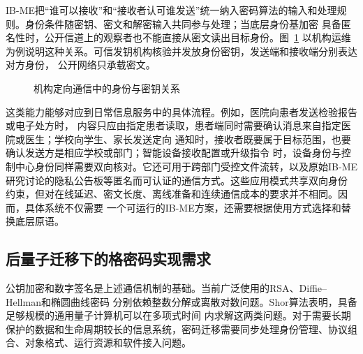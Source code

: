 IB-ME把“谁可以接收”和“接收者认可谁发送”统一纳入密码算法的输入和处理规则。身份条件随密钥、密文和解密输入共同参与处理；当底层身份基加密
具备匿名性时，公开信道上的观察者也不能直接从密文读出目标身份。图~\ref{fig:application-background}
以机构运维为例说明这种关系。可信发钥机构核验并发放身份密钥，发送端和接收端分别表达对方身份，
公开网络只承载密文。

\begin{figure}[H]
\centering
{}
\caption{机构定向通信中的身份与密钥关系}
\label{fig:application-background}
\end{figure}

这类能力能够对应到日常信息服务中的具体流程。例如，医院向患者发送检验报告或电子处方时，
内容只应由指定患者读取，患者端同时需要确认消息来自指定医院或医生；学校向学生、家长发送定向
通知时，接收者既要属于目标范围，也要确认发送方是相应学校或部门；智能设备接收配置或升级指令
时，设备身份与控制中心身份同样需要双向核对。它还可用于跨部门受控文件流转，以及原始IB-ME
研究讨论的隐私公告板等匿名而可认证的通信方式\cite{ateniese2019me}。这些应用模式共享双向身份
约束，但对在线延迟、密文长度、离线准备和连续通信成本的要求并不相同。因而，具体系统不仅需要
一个可运行的IB-ME方案，还需要根据使用方式选择和替换底层原语。

\subsection{后量子迁移下的格密码实现需求}

公钥加密和数字签名是上述通信机制的基础。当前广泛使用的RSA、Diffie--Hellman和椭圆曲线密码
分别依赖整数分解或离散对数问题。Shor算法表明，具备足够规模的通用量子计算机可以在多项式时间
内求解这两类问题\cite{shor1994}。对于需要长期保护的数据和生命周期较长的信息系统，密码迁移需要同步处理身份管理、协议组合、对象格式、运行资源和软件接入问题。


